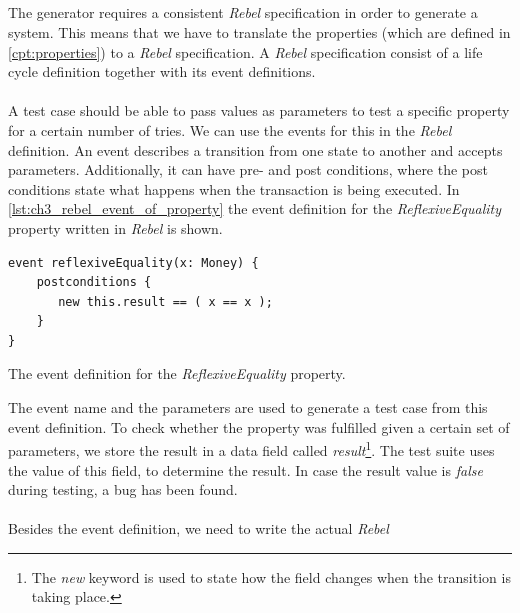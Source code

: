 \subsection{\tfPhaseOne{}}
\label{sct:3_prop_to_rebel}
The generator requires a consistent \textit{Rebel} specification in order to
generate a system. This means that we have to translate the properties (which
are defined in \autoref{cpt:properties}) to a \textit{Rebel} specification. A
\textit{Rebel} specification consist of a life cycle definition together with
its event definitions.\\
\\
A test case should be able to pass values as parameters to test a specific
property for a certain number of tries. We can use the events for this in the
\textit{Rebel} definition. An event describes a transition from one state to
another and accepts parameters. Additionally, it can have pre- and
post conditions, where the post conditions state what happens when the transaction
is being executed. In \autoref{lst:ch3_rebel_event_of_property} the event
definition for the \textit{ReflexiveEquality} property written in \textit{Rebel}
is shown.
\begin{sourcecode}[!ht]
\begin{lstlisting}[language=Rebel]
event reflexiveEquality(x: Money) {
    postconditions {
       new this.result == ( x == x );
    }
}
\end{lstlisting}
\caption{The event definition for the \textit{ReflexiveEquality} property.}
\label{lst:ch3_rebel_event_of_property}
\end{sourcecode}
\FloatBarrier
The event name and the parameters are used to generate a test case from this
event definition. To check whether the property was fulfilled given a certain
set of parameters, we store the result in a data field called
\textit{result}\footnote{The \textit{new} keyword is used to state how the field
changes when the transition is taking place.}. The test suite uses the value of
this field, to determine the result. In case the result value is \textit{false}
during testing, a bug has been found.\\
\\
Besides the event definition, we need to write the actual \textit{Rebel}
